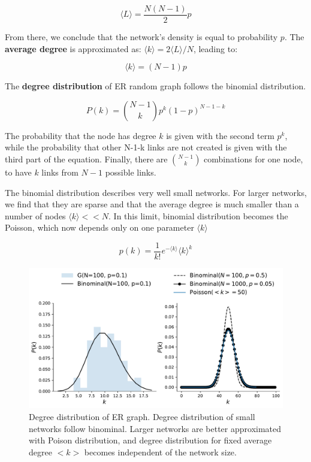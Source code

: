 \begin{equation}
\langle L \rangle = \frac{N(N-1)}{2}p
\end{equation}

From there, we conclude that the network's density is equal to probability $p$.
The \textbf{average degree} is approximated as: $\langle k \rangle = 2 \langle L \rangle / N $, leading to:

\begin{equation}
\langle k \rangle = (N-1)p 
\end{equation}

The \textbf{degree distribution} of ER random graph follows the binomial distribution. 

\begin{equation}
P(k) = \binom{N-1}{k}p^k(1-p)^{N-1-k}
\end{equation}

The probability that the node has degree $k$ is given with the second term $p^k$, while the probability that other N-1-k links are not created is given with the third part of the equation. Finally, there are  $\binom{N-1}{k}$ combinations for one node, to have $k$ links from $N-1$ possible links. 

The binomial distribution describes very well small networks. For larger networks, we find that they are sparse and that the average degree is much smaller than a number of nodes $\langle k \rangle << N$. In this limit, binomial distribution becomes the Poisson, which now depends only on one parameter $\langle k \rangle$

\begin{equation}
p(k) = \frac{1}{k!}e^{-\langle k \rangle}\langle k \rangle^{k}
\end{equation}

\begin{figure}[h!]
	\centering
	\includegraphics[width=0.9\linewidth]{figures/methodology/ER_dist}
	\caption{Degree distribution of ER graph. Degree distribution of small networks follow binominal. Larger networks are better approximated with Poison distribution, and degree distribution for fixed average degree $<k>$ becomes independent of the network size.}
	\label{fig:erdist}
\end{figure}

